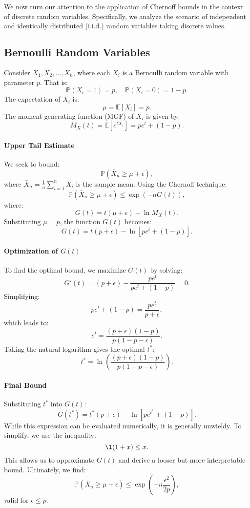 We now turn our attention to the application of Chernoff bounds in the context of discrete random variables. Specifically, we analyze the scenario of independent and identically distributed (i.i.d.) random variables taking discrete values. 

\subsection{Bernoulli Random Variables}
Consider \( X_1, X_2, \dots, X_n \), where each \( X_i \) is a Bernoulli random variable with parameter \( p \). That is:
\[
\mathbb{P}(X_i = 1) = p, \quad \mathbb{P}(X_i = 0) = 1 - p.
\]
The expectation of \( X_i \) is:
\[
\mu = \mathbb{E}[X_i] = p.
\]
The moment-generating function (MGF) of \( X_i \) is given by:
\[
M_X(t) = \mathbb{E}\left[e^{t X_i}\right] = p e^t + (1 - p).
\]

\paragraph{Upper Tail Estimate}
We seek to bound:
\[
\mathbb{P}(\bar{X}_n \geq \mu + \epsilon),
\]
where \( \bar{X}_n = \frac{1}{n} \sum_{i=1}^n X_i \) is the sample mean. Using the Chernoff technique:
\[
\mathbb{P}(\bar{X}_n \geq \mu + \epsilon) \leq \exp\left(-n G(t)\right),
\]
where:
\[
G(t) = t (\mu + \epsilon) - \ln M_X(t).
\]
Substituting \( \mu = p \), the function \( G(t) \) becomes:
\[
G(t) = t (p + \epsilon) - \ln\left[p e^t + (1 - p)\right].
\]

\paragraph{Optimization of \( G(t) \)}
To find the optimal bound, we maximize \( G(t) \) by solving:
\[
G'(t) = (p + \epsilon) - \frac{p e^t}{p e^t + (1 - p)} = 0.
\]
Simplifying:
\[
p e^t + (1 - p) = \frac{p e^t}{p + \epsilon},
\]
which leads to:
\[
e^t = \frac{(p + \epsilon)(1 - p)}{p (1 - p - \epsilon)}.
\]
Taking the natural logarithm gives the optimal \( t^* \):
\[
t^* = \ln\left(\frac{(p + \epsilon)(1 - p)}{p (1 - p - \epsilon)}\right).
\]

\paragraph{Final Bound}
Substituting \( t^* \) into \( G(t) \):
\[
G(t^*) = t^* (p + \epsilon) - \ln\left[p e^{t^*} + (1 - p)\right].
\]
While this expression can be evaluated numerically, it is generally unwieldy. To simplify, we use the inequality:
\[
\l(1 + x) \leq x.
\]
This allows us to approximate \( G(t) \) and derive a looser but more interpretable bound. Ultimately, we find:
\[
\mathbb{P}(\bar{X}_n \geq \mu + \epsilon) \leq \exp\left(-n \frac{\epsilon^2}{2p}\right),
\]
valid for \( \epsilon \leq p \).


